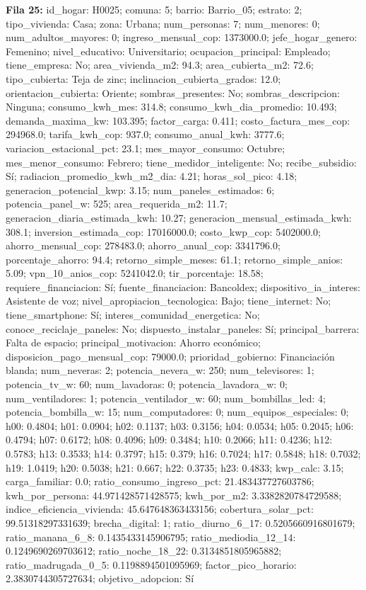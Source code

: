 {\footnotesize\textbf{Fila 25:} id\_hogar: H0025; comuna: 5; barrio: Barrio\_05; estrato: 2; tipo\_vivienda: Casa; zona: Urbana; num\_personas: 7; num\_menores: 0; num\_adultos\_mayores: 0; ingreso\_mensual\_cop: 1373000.0; jefe\_hogar\_genero: Femenino; nivel\_educativo: Universitario; ocupacion\_principal: Empleado; tiene\_empresa: No; area\_vivienda\_m2: 94.3; area\_cubierta\_m2: 72.6; tipo\_cubierta: Teja de zinc; inclinacion\_cubierta\_grados: 12.0; orientacion\_cubierta: Oriente; sombras\_presentes: No; sombras\_descripcion: Ninguna; consumo\_kwh\_mes: 314.8; consumo\_kwh\_dia\_promedio: 10.493; demanda\_maxima\_kw: 103.395; factor\_carga: 0.411; costo\_factura\_mes\_cop: 294968.0; tarifa\_kwh\_cop: 937.0; consumo\_anual\_kwh: 3777.6; variacion\_estacional\_pct: 23.1; mes\_mayor\_consumo: Octubre; mes\_menor\_consumo: Febrero; tiene\_medidor\_inteligente: No; recibe\_subsidio: Sí; radiacion\_promedio\_kwh\_m2\_dia: 4.21; horas\_sol\_pico: 4.18; generacion\_potencial\_kwp: 3.15; num\_paneles\_estimados: 6; potencia\_panel\_w: 525; area\_requerida\_m2: 11.7; generacion\_diaria\_estimada\_kwh: 10.27; generacion\_mensual\_estimada\_kwh: 308.1; inversion\_estimada\_cop: 17016000.0; costo\_kwp\_cop: 5402000.0; ahorro\_mensual\_cop: 278483.0; ahorro\_anual\_cop: 3341796.0; porcentaje\_ahorro: 94.4; retorno\_simple\_meses: 61.1; retorno\_simple\_anios: 5.09; vpn\_10\_anios\_cop: 5241042.0; tir\_porcentaje: 18.58; requiere\_financiacion: Sí; fuente\_financiacion: Bancoldex; dispositivo\_ia\_interes: Asistente de voz; nivel\_apropiacion\_tecnologica: Bajo; tiene\_internet: No; tiene\_smartphone: Sí; interes\_comunidad\_energetica: No; conoce\_reciclaje\_paneles: No; dispuesto\_instalar\_paneles: Sí; principal\_barrera: Falta de espacio; principal\_motivacion: Ahorro económico; disposicion\_pago\_mensual\_cop: 79000.0; prioridad\_gobierno: Financiación blanda; num\_neveras: 2; potencia\_nevera\_w: 250; num\_televisores: 1; potencia\_tv\_w: 60; num\_lavadoras: 0; potencia\_lavadora\_w: 0; num\_ventiladores: 1; potencia\_ventilador\_w: 60; num\_bombillas\_led: 4; potencia\_bombilla\_w: 15; num\_computadores: 0; num\_equipos\_especiales: 0; h00: 0.4804; h01: 0.0904; h02: 0.1137; h03: 0.3156; h04: 0.0534; h05: 0.2045; h06: 0.4794; h07: 0.6172; h08: 0.4096; h09: 0.3484; h10: 0.2066; h11: 0.4236; h12: 0.5783; h13: 0.3533; h14: 0.3797; h15: 0.379; h16: 0.7024; h17: 0.5848; h18: 0.7032; h19: 1.0419; h20: 0.5038; h21: 0.667; h22: 0.3735; h23: 0.4833; kwp\_calc: 3.15; carga\_familiar: 0.0; ratio\_consumo\_ingreso\_pct: 21.483437727603786; kwh\_por\_persona: 44.971428571428575; kwh\_por\_m2: 3.3382820784729588; indice\_eficiencia\_vivienda: 45.647648363433156; cobertura\_solar\_pct: 99.51318297331639; brecha\_digital: 1; ratio\_diurno\_6\_17: 0.5205660916801679; ratio\_manana\_6\_8: 0.1435433145906795; ratio\_mediodia\_12\_14: 0.1249690269703612; ratio\_noche\_18\_22: 0.3134851805965882; ratio\_madrugada\_0\_5: 0.1198894501095969; factor\_pico\_horario: 2.3830744305727634; objetivo\_adopcion: Sí\par}
